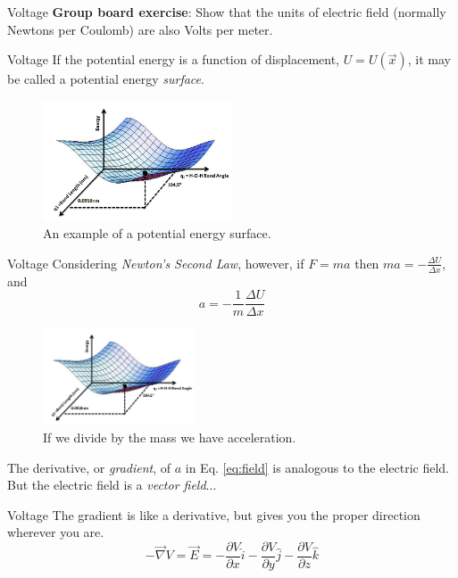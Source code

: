 \documentclass{beamer}
\begin{document}
\begin{frame}{Voltage}
\textbf{Group board exercise}: Show that the units of electric field (normally Newtons per Coulomb) are also Volts per meter.
\end{frame}

\begin{frame}{Voltage}
\small
If the potential energy is a function of displacement, $U = U(\vec{x})$, it may be called a potential energy \textit{surface}.
\begin{figure}
\centering
\includegraphics[width=0.5\textwidth]{figures/potential.png}
\caption{\label{fig:potential} An example of a potential energy surface.}
\end{figure}
\end{frame}

\begin{frame}{Voltage}
\small
Considering \textit{Newton's Second Law}, however, if $F = m a$ then $m a = -\frac{\Delta U}{\Delta x}$, and
\begin{equation}
a = -\frac{1}{m}\frac{\Delta U}{\Delta x} \label{eq:field}
\end{equation}
\begin{figure}
\centering
\includegraphics[width=0.4\textwidth]{figures/potential.png}
\caption{\label{fig:potential2} If we divide by the mass we have acceleration.}
\end{figure}
The derivative, or \textit{gradient}, of $a$ in Eq. \ref{eq:field} is analogous to the electric field.  But the electric field is a \textit{vector field}...
\end{frame}

\begin{frame}{Voltage}
The gradient is like a derivative, but gives you the proper direction wherever you are.
\begin{equation}
\boxed{
-\vec{\nabla} V = \vec{E} = -\frac{\partial V}{\partial x}\hat{i}-\frac{\partial V}{\partial y}\hat{j}-\frac{\partial V}{\partial z}\hat{k}}
\end{equation}
\end{frame}
\end{document}
